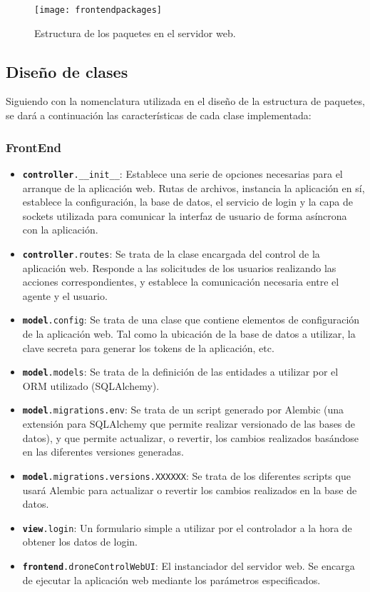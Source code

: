 \begin{figure}[H]
	\centering
	\texttt{[image: frontendpackages]}
	\caption[Estructura de paquetes en servidor web]{Estructura de los paquetes en el servidor web.}\label{fig:frontpackages}
\end{figure}

\subsection{Diseño de clases}

Siguiendo con la nomenclatura utilizada en el diseño de la estructura de paquetes, se dará a continuación las características de cada clase implementada: 
\subsubsection{FrontEnd}
\begin{itemize}
\item \texttt{\textbf{controller}.\_\_init\_\_}: Establece una serie de opciones necesarias para el arranque de la aplicación web. Rutas de archivos, instancia la aplicación en sí, establece la configuración, la base de datos, el servicio de login y la capa de sockets utilizada para comunicar la interfaz de usuario de forma asíncrona con la aplicación.
\item \texttt{\textbf{controller}.routes}: Se trata de la clase encargada del control de la aplicación web. Responde a las solicitudes de los usuarios realizando las acciones correspondientes, y establece la comunicación necesaria entre el agente y el usuario.
\item \texttt{\textbf{model}.config}: Se trata de una clase que contiene elementos de configuración de la aplicación web. Tal como la ubicación de la base de datos a utilizar, la clave secreta para generar los tokens de la aplicación, etc.
\item \texttt{\textbf{model}.models}: Se trata de la definición de las entidades a utilizar por el ORM utilizado (SQLAlchemy).
\item \texttt{\textbf{model}.migrations.env}: Se trata de un script generado por Alembic (una extensión para SQLAlchemy que permite realizar versionado de las bases de datos), y que permite actualizar, o revertir, los cambios realizados basándose en las diferentes versiones generadas. 
\item \texttt{\textbf{model}.migrations.versions.XXXXXX}: Se trata de los diferentes scripts que usará Alembic para actualizar o revertir los cambios realizados en la base de datos.
\item \texttt{\textbf{view}.login}: Un formulario simple a utilizar por el controlador a la hora de obtener los datos de login.
\item \texttt{\textbf{frontend}.droneControlWebUI}: El instanciador del servidor web. Se encarga de ejecutar la aplicación web mediante los parámetros especificados.
\end{itemize}


